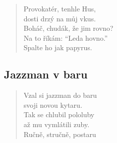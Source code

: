 \begin{multicols}{2}
\begin{verse}
Provokatér, tenhle Hus,\\
dosti drzý na můj vkus.\\
Boháč, chudák, že jim rovno?\\
Na to říkám: “Leda hovno.”\\
Spalte ho jak papyrus.
\end{verse}
	
\subsection{Jazzman v baru}
	
\begin{verse}
Vzal si jazzman do baru\\
svoji novou kytaru.\\
Tak se chlubil pololuby\\
až mu vymlátili zuby.\\
Ručně, stručně, postaru
\end{verse}
	
\end{multicols}